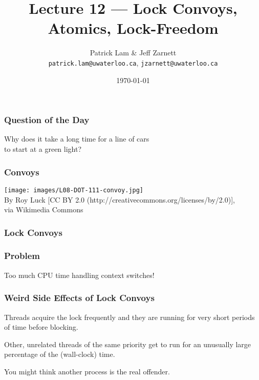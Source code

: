 

\title{Lecture 12 --- Lock Convoys, Atomics, Lock-Freedom}

\author{Patrick Lam \& Jeff Zarnett \\ \small \texttt{patrick.lam@uwaterloo.ca}, \texttt{jzarnett@uwaterloo.ca}}
\date{\today}




\begin{frame}
  \titlepage

 \end{frame}
 

\begin{frame}
\frametitle{Question of the Day}
\Large
\vspace*{-3em}
Why does it take a long time for a line of cars \\
to start at a green light?

\end{frame}

\begin{frame}
\frametitle{Convoys}
\begin{center}
\texttt{[image: images/L08-DOT-111-convoy.jpg]}\\
By Roy Luck [CC BY 2.0 (http://creativecommons.org/licenses/by/2.0)], \\
via Wikimedia Commons
\end{center}
\end{frame}

\begin{frame}
\frametitle{Lock Convoys}
\begin{center}
\scalebox{0.4}{
}
\end{center}
\end{frame}

\begin{frame}
\frametitle{Problem}
\begin{center}
\Large
\vspace*{-2em}
Too much CPU time handling context switches!
\end{center}
\end{frame}

\begin{frame}
\frametitle{Weird Side Effects of Lock Convoys}

Threads acquire the lock frequently and they are running for very short periods of time before blocking. 

Other, unrelated threads of the same priority get to run for an unusually large percentage of the (wall-clock) time. 

You might think another process is the real offender.

\end{frame}

